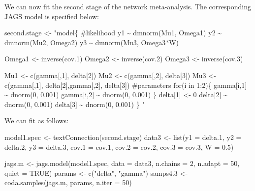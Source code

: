 \documentclass[
  letterpaper,
  DIV=11,
  numbers=noendperiod]{scrreprt}
\newenvironment{Shaded}{\begin{snugshade}}{\end{snugshade}}
\newcommand{\AttributeTok}[1]{\textcolor[rgb]{0.40,0.45,0.13}{#1}}
\newcommand{\ConstantTok}[1]{\textcolor[rgb]{0.56,0.35,0.01}{#1}}
\newcommand{\DecValTok}[1]{\textcolor[rgb]{0.68,0.00,0.00}{#1}}
\newcommand{\FloatTok}[1]{\textcolor[rgb]{0.68,0.00,0.00}{#1}}
\newcommand{\FunctionTok}[1]{\textcolor[rgb]{0.28,0.35,0.67}{#1}}
\newcommand{\NormalTok}[1]{\textcolor[rgb]{0.00,0.23,0.31}{#1}}
\newcommand{\OtherTok}[1]{\textcolor[rgb]{0.00,0.23,0.31}{#1}}
\newcommand{\StringTok}[1]{\textcolor[rgb]{0.13,0.47,0.30}{#1}}
\begin{document}
We can now fit the second stage of the network meta-analysis. The
corresponding JAGS model is specified below:

\begin{Shaded}
\begin{Highlighting}[]
\NormalTok{second.stage }\OtherTok{\textless{}{-}}
\StringTok{"model\{}
\StringTok{  }
\StringTok{  \#likelihood}
\StringTok{  y1 \textasciitilde{} dmnorm(Mu1, Omega1)}
\StringTok{  y2 \textasciitilde{} dmnorm(Mu2, Omega2)}
\StringTok{  y3 \textasciitilde{} dmnorm(Mu3, Omega3*W)}

\StringTok{  }
\StringTok{  Omega1 \textless{}{-} inverse(cov.1)}
\StringTok{  Omega2 \textless{}{-} inverse(cov.2)}
\StringTok{  Omega3 \textless{}{-} inverse(cov.3)}

\StringTok{  Mu1 \textless{}{-} c(gamma[,1], delta[2])}
\StringTok{  Mu2 \textless{}{-} c(gamma[,2], delta[3])  }
\StringTok{  Mu3 \textless{}{-} c(gamma[,1], delta[2],gamma[,2], delta[3])}
\StringTok{  }
\StringTok{  \#parameters}
\StringTok{  for(i in 1:2)\{}
\StringTok{    gamma[i,1] \textasciitilde{} dnorm(0, 0.001)}
\StringTok{    gamma[i,2] \textasciitilde{} dnorm(0, 0.001)}
\StringTok{  \}}
\StringTok{  }
\StringTok{  delta[1] \textless{}{-} 0}
\StringTok{  delta[2] \textasciitilde{} dnorm(0, 0.001)}
\StringTok{  delta[3] \textasciitilde{} dnorm(0, 0.001)}
\StringTok{  }
\StringTok{\}}
\StringTok{"}
\end{Highlighting}
\end{Shaded}

We can fit as follows:

\begin{Shaded}
\begin{Highlighting}[]
\NormalTok{model1.spec }\OtherTok{\textless{}{-}} \FunctionTok{textConnection}\NormalTok{(second.stage) }
\NormalTok{data3 }\OtherTok{\textless{}{-}} \FunctionTok{list}\NormalTok{(}\AttributeTok{y1 =}\NormalTok{ delta}\FloatTok{.1}\NormalTok{, }\AttributeTok{y2 =}\NormalTok{ delta}\FloatTok{.2}\NormalTok{, }\AttributeTok{y3 =}\NormalTok{ delta}\FloatTok{.3}\NormalTok{, }
              \AttributeTok{cov.1 =}\NormalTok{ cov}\FloatTok{.1}\NormalTok{, }\AttributeTok{cov.2 =}\NormalTok{ cov}\FloatTok{.2}\NormalTok{, }\AttributeTok{cov.3 =}\NormalTok{ cov}\FloatTok{.3}\NormalTok{, }\AttributeTok{W =} \FloatTok{0.5}\NormalTok{)}

\NormalTok{jags.m }\OtherTok{\textless{}{-}} \FunctionTok{jags.model}\NormalTok{(model1.spec, }\AttributeTok{data =}\NormalTok{ data3, }\AttributeTok{n.chains =} \DecValTok{2}\NormalTok{, }\AttributeTok{n.adapt =} \DecValTok{50}\NormalTok{,}
                     \AttributeTok{quiet =} \ConstantTok{TRUE}\NormalTok{)}
\NormalTok{params }\OtherTok{\textless{}{-}} \FunctionTok{c}\NormalTok{(}\StringTok{"delta"}\NormalTok{, }\StringTok{"gamma"}\NormalTok{) }
\NormalTok{samps4}\FloatTok{.3} \OtherTok{\textless{}{-}} \FunctionTok{coda.samples}\NormalTok{(jags.m, params, }\AttributeTok{n.iter =} \DecValTok{50}\NormalTok{)}
\end{Highlighting}
\end{Shaded}
\end{document}
